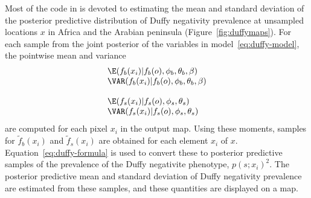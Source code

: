 \documentclass[article]{jss}
\begin{document}
\bigskip
Most of the code in  is devoted to estimating the mean and standard deviation of the posterior predictive distribution of Duffy negativity prevalence at unsampled locations $x$ in Africa and the Arabian peninsula (Figure~\ref{fig:duffymaps}). For each sample from the joint posterior of the variables in model~\ref{eq:duffy-model}, 
the pointwise mean and variance 
\begin{equation}
    \label{eq:map-moments} 
    \begin{array}{l}
        \E(f_b(x_i)|f_b(o), \phi_b, \theta_b, \beta)\\
        \VAR(f_b(x_i)|f_b(o), \phi_b, \theta_b, \beta)\\\\
        \E(f_s(x_i)|f_s(o), \phi_s, \theta_s)\\
        \VAR(f_s(x_i)|f_s(o), \phi_s, \theta_s)
    \end{array}
\end{equation}
are computed for each pixel $x_i$ in the output map. Using these moments, samples for $\tilde f_b(x_i)$ and $\tilde f_s(x_i)$ are obtained for each element $x_i$ of $x$. Equation~\ref{eq:duffy-formula} is used to convert these to posterior predictive samples of the prevalence of the Duffy negativite phenotype, $p(s;x_i)^2$. The posterior predictive mean and standard deviation of Duffy negativity prevalence are estimated from these samples, and these quantities are displayed on a map.
\end{document}
